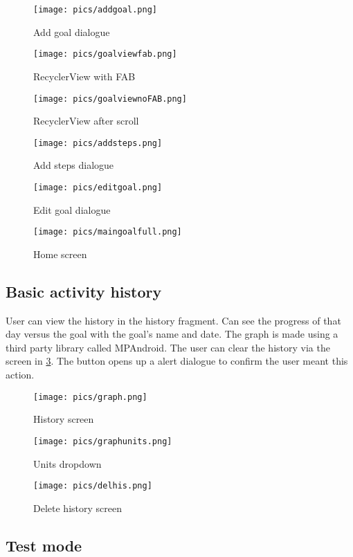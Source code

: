 \documentclass[12pt]{report}
\begin{document}
\begin{figure}[!htb]
  \texttt{[image: pics/addgoal.png]}
  \caption{Add goal dialogue}
  \label{fig:addgoal}
\endminipage\hfill
{}
  \texttt{[image: pics/goalviewfab.png]}
  \caption{RecyclerView with FAB}\label{fig:goalviewfab}
\endminipage\hfill
{}%
  \texttt{[image: pics/goalviewnoFAB.png]}
  \caption{RecyclerView after scroll}\label{fig:goalviewnofab}
\endminipage
\end{figure}
\begin{figure}[!htb]
  \texttt{[image: pics/addsteps.png]}
  \caption{Add steps dialogue}
  \label{fig:addsteps}
\endminipage\hfill
{}
  \texttt{[image: pics/editgoal.png]}
  \caption{Edit goal dialogue}\label{fig:editgoal}
\endminipage\hfill
{}%
  \texttt{[image: pics/maingoalfull.png]}
  \caption{Home screen}\label{fig:maingoalfull}
\endminipage
\end{figure}

\subsection{Basic activity history}

User can view the history in the history fragment. Can see the progress of that day versus the goal with the goal's name and date. The graph is made using a third party library called MPAndroid. The user can clear the history via the screen in \ref{fig:delhis}. The button opens up a alert dialogue to confirm the user meant this action.

\begin{figure}[!htb]
  \texttt{[image: pics/graph.png]}
  \caption{History screen}
  \label{fig:graph}
\endminipage\hfill
{}
  \texttt{[image: pics/graphunits.png]}
  \caption{Units dropdown}\label{fig:graphunits}
\endminipage\hfill
{}%
  \texttt{[image: pics/delhis.png]}
  \caption{Delete history screen}\label{fig:delhis}
\endminipage
\end{figure}

\subsection{Test mode}
\end{document}

